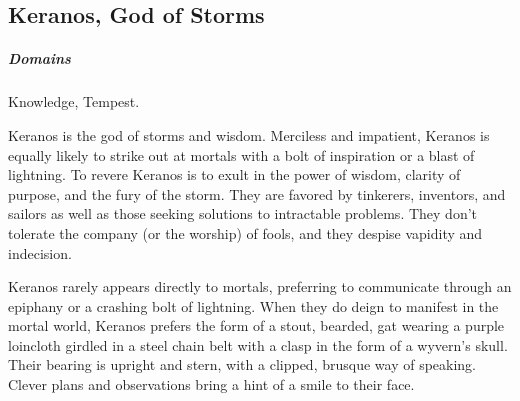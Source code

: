 
\vspace{14.5cm}

\subsection*{Keranos, God of Storms} \label{ssec::keranos}
    \subparagraph{Domains} Knowledge, Tempest.

    Keranos is the god of storms and wisdom.
    Merciless and impatient, Keranos is equally likely to strike out at mortals with a bolt of inspiration or a blast of lightning.
    To revere Keranos is to exult in the power of wisdom, clarity of purpose, and the fury of the storm.
    They are favored by tinkerers, inventors, and sailors as well as those seeking solutions to intractable problems.
    They don't tolerate the company (or the worship) of fools, and they despise vapidity and indecision.

    Keranos rarely appears directly to mortals, preferring to communicate through an epiphany or a crashing bolt of lightning.
    When they do deign to manifest in the mortal world, Keranos prefers the form of a stout, bearded, gat wearing a purple loincloth girdled in a steel chain belt with a clasp in the form of a wyvern's skull.
    Their bearing is upright and stern, with a clipped, brusque way of speaking.
    Clever plans and observations bring a hint of a smile to their face.

